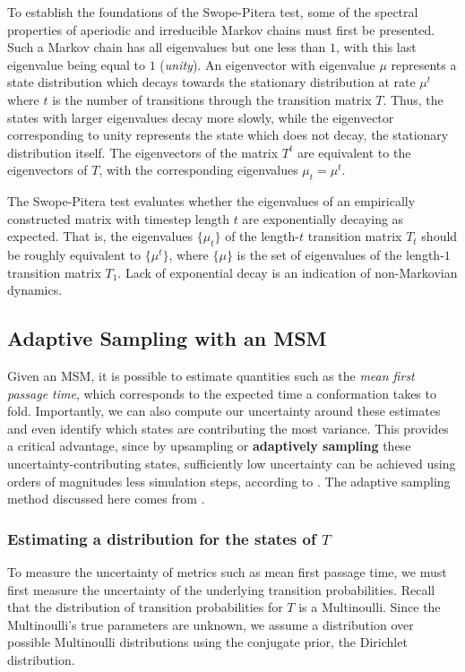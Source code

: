 \documentclass{article}
\begin{document}
To establish the foundations of the Swope-Pitera test, some of the spectral properties of aperiodic and irreducible Markov chains must first be presented. Such a Markov chain has all eigenvalues but one less than $1$, with this last eigenvalue being equal to $1$ (\textit{unity}). An eigenvector with eigenvalue $\mu$ represents a state distribution which decays towards the stationary distribution at rate $\mu^t$ where $t$ is the number of transitions through the transition matrix $T$. Thus, the states with larger eigenvalues decay more slowly, while the eigenvector corresponding to unity represents the state which does not decay, the stationary distribution itself. The eigenvectors of the matrix $T^t$ are equivalent to the eigenvectors of $T$, with the corresponding eigenvalues $\mu_t = \mu^t$.

The Swope-Pitera test evaluates whether the eigenvalues of an empirically constructed matrix with timestep length $t$ are exponentially decaying as expected. That is, the eigenvalues $\{\mu_t\}$ of the length-$t$ transition matrix $T_t$ should be roughly equivalent to $\{\mu^t\}$, where $\{\mu\}$ is the set of eigenvalues of the length-$1$ transition matrix $T_1$. Lack of exponential decay is an indication of non-Markovian dynamics.

\subsection{Adaptive Sampling with an MSM}
Given an MSM, it is possible to estimate quantities such as the \textit{mean first passage time}, which corresponds to the expected time a conformation takes to fold. Importantly, we can also compute our uncertainty around these estimates and even identify which states are contributing the most variance. This provides a critical advantage, since by upsampling or \textbf{adaptively sampling} these uncertainty-contributing states, sufficiently low uncertainty can be achieved using orders of magnitudes less simulation steps, according to \cite{pande2010}. The adaptive sampling method discussed here comes from \cite{adaptivesampling}.

\subsubsection{Estimating a distribution for the states of $T$}
To measure the uncertainty of metrics such as mean first passage time, we must first measure the uncertainty of the underlying transition probabilities. Recall that the distribution of transition probabilities for $T$ is a Multinoulli. Since the Multinoulli's true parameters are unknown, we assume a distribution over possible Multinoulli distributions using the conjugate prior, the Dirichlet distribution.
\end{document}
